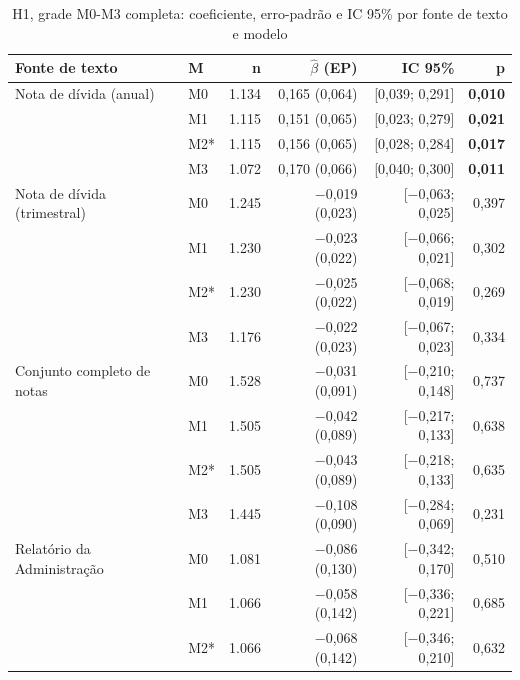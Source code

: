 \documentclass[a4paper,12pt]{report}
\begin{document}
\begin{table}[htbp]
    \centering
    \caption{H1, grade M0-M3 completa: coeficiente, erro-padrão e IC 95\% por fonte de texto e modelo}
    \label{tab:h1_m2_detalhe}
    \small
    \begin{tabular}{@{}llrrrr@{}}
        \toprule
        \textbf{Fonte de texto} & \textbf{M} & \textbf{n} & \textbf{$\hat\beta$ (EP)} & \textbf{IC 95\%} & \textbf{p} \\
        \midrule
        Nota de dívida (anual)      & M0 & 1.134 & 0,165 (0,064) & [0,039; 0,291] & \textbf{0,010} \\
                                     & M1 & 1.115 & 0,151 (0,065) & [0,023; 0,279] & \textbf{0,021} \\
                                     & M2* & 1.115 & 0,156 (0,065) & [0,028; 0,284] & \textbf{0,017} \\
                                     & M3 & 1.072 & 0,170 (0,066) & [0,040; 0,300] & \textbf{0,011} \\
        Nota de dívida (trimestral) & M0 & 1.245 & $-$0,019 (0,023) & [$-$0,063; 0,025] & 0,397 \\
                                     & M1 & 1.230 & $-$0,023 (0,022) & [$-$0,066; 0,021] & 0,302 \\
                                     & M2* & 1.230 & $-$0,025 (0,022) & [$-$0,068; 0,019] & 0,269 \\
                                     & M3 & 1.176 & $-$0,022 (0,023) & [$-$0,067; 0,023] & 0,334 \\
        Conjunto completo de notas  & M0 & 1.528 & $-$0,031 (0,091) & [$-$0,210; 0,148] & 0,737 \\
                                     & M1 & 1.505 & $-$0,042 (0,089) & [$-$0,217; 0,133] & 0,638 \\
                                     & M2* & 1.505 & $-$0,043 (0,089) & [$-$0,218; 0,133] & 0,635 \\
                                     & M3 & 1.445 & $-$0,108 (0,090) & [$-$0,284; 0,069] & 0,231 \\
        Relatório da Administração  & M0 & 1.081 & $-$0,086 (0,130) & [$-$0,342; 0,170] & 0,510 \\
                                     & M1 & 1.066 & $-$0,058 (0,142) & [$-$0,336; 0,221] & 0,685 \\
                                     & M2* & 1.066 & $-$0,068 (0,142) & [$-$0,346; 0,210] & 0,632 \\

\end{tabular}
\end{table}
\end{document}
